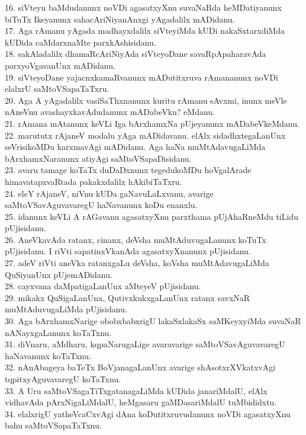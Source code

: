 \documentclass{article}
\begin{document}
16. siVteyu baMdudanunx noVDi agasatxyXnu suvaNaRda heMDatiyanunx biTuTx Ikeyanunx sahacAriNiyanAnxgi yAgadalilx mADidanu.\\
17. Aga rAmanu yAgada madhayxdalilx siVteyiMda kUDi nakaSxtarxdiMda kUDida caMdarxnaMte parxkAshisidanu.\\
18. sakAladalilx dhamaRcAriNiyAda siVteyoDane savaRpApaharavAda parxyoVgavanUnx mADidanu.\\
19. siVteyoDane yajacnxkamaRvanunx mADutitxruva rAmananunx noVDi elalxrU saMtoVSapaTaTxru.\\
20. Aga A yAgadalilx vasiSaThxnanunx kuritu rAmanu sAvxmi, inunx meVle nAneVnu avashayxkavAdudanunx mADabeVku? eMdanu.\\
21. rAmana mAtanunx keVLi Iga bArxhamxNa pUjeyanunx mADabeVkeMdanu.\\
22. marututx rAjaneV modalu yAga mADidavanu. elAlx sidadhxtegaLanUnx seVrisikoMDu karxmavAgi mADidanu. Aga haNa muMtAdavugaLiMda bArxhamxNaranunx atiyAgi saMtoVSapaDisidanu.\\
23. avaru tamage koTaTx duDaDxnunx tegedukoMDu hoVgalArade himavatapxvaRtada pakakxdalilx hAkibiTaTxru.\\
24. eleY rAjaneV, niVnu kUDa gaNavuLaLxvanu, avarige saMtoVSavAguvavaregU haNavanunx koDu enanxlu.\\
25. idanunx keVLi A rAGavanu agasatxyXnu parxthama pUjAhaRneMdu tiLidu pUjisidanu.\\
26. AneVkavAda ratanx, cinanx, deVsha muMtAduvugaLanunx koTuTx pUjisidanu. I riVti sapatinxVkanAda agasatxyXnanunx pUjisidanu.\\
27. adeV riVti aneVka ratanxgaLu deVsha, koVsha muMtAdavugaLiMda QuSiyanUnx pUjemADidanu.\\
28. cayxvana daMpatigaLanUnx aMteyeV pUjisidanu.\\
29. mikakx QuSigaLanUnx, QutivxkukxgaLanUnx ratanx savxNaR muMtAduvugaLiMda pUjisidanu.\\
30. Aga bArxhamxNarige obobxbabxrigU lakaSxlakaSx saMKeyxyiMda suvaNaR nANayxgaLanunx koTaTxnu.\\
31. diVnaru, aMdharu, kqpaNarugaLige avaravarige saMtoVSavAguvavaregU haNavanunx koTaTxnu.\\
32. nAnAbageya baTeTx BoVjanagaLanUnx avarige shAsotxrXVkatxvAgi tqpitxyAguvavaregU koTaTxnu.\\
33. A Uru saMtoVSagaTiTxgatanagaLiMda kUDida janariMdalU, elAlx vidhavAda pArxNigaLiMdalU, heMgasaru gaMDasariMdalU tuMbididxtu.\\
34. elalxrigU yatheVcaCxvAgi dAna koDutitxruvudanunx noVDi agasatxyXnu bahu saMtoVSapaTaTxnu.\\
\end{document}
